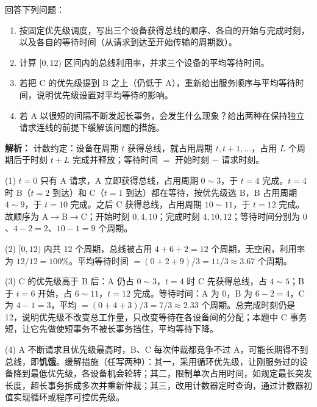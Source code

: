 \begin{enumerate}[resume]
回答下列问题：

\begin{enumerate}
\item[(1)] 按固定优先级调度，写出三个设备获得总线的顺序、各自的开始与完成时刻，以及各自的等待时间（从请求到达至开始传输的周期数）。
\item[(2)] 计算 $[0,12)$ 区间内的总线利用率，并求三个设备的平均等待时间。
\item[(3)] 若把 C 的优先级提到 B 之上（仍低于 A），重新给出服务顺序与平均等待时间，说明优先级设置对平均等待的影响。
\item[(4)] 若 A 以很短的间隔不断发起长事务，会发生什么现象？给出两种在保持独立请求连线的前提下缓解该问题的措施。
\end{enumerate}

\ifshowsolutions\par\noindent\textbf{解析：} 计数约定：设备在周期 $t$ 获得总线，就占用周期 $t,t+1,\dots$，占用 $L$ 个周期后于时刻 $t+L$ 完成并释放；等待时间 $=$ 开始时刻 $-$ 请求时刻。

(1) $t=0$ 只有 A 请求，A 立即获得总线，占用周期 $0\sim3$，于 $t=4$ 完成。$t=4$ 时 B（$t=2$ 到达）和 C（$t=1$ 到达）都在等待，按优先级选 B，B 占用周期 $4\sim9$，于 $t=10$ 完成。之后 C 获得总线，占用周期 $10\sim11$，于 $t=12$ 完成。故顺序为 A$\to$B$\to$C；开始时刻 $0,4,10$；完成时刻 $4,10,12$；等待时间分别为 $0$、$4-2=2$、$10-1=9$ 个周期。

(2) $[0,12)$ 内共 12 个周期，总线被占用 $4+6+2=12$ 个周期，无空闲，利用率为 $12/12=100\%$。平均等待时间 $=(0+2+9)/3=11/3\approx3.67$ 个周期。

(3) C 的优先级高于 B 后：A 仍占 $0\sim3$，$t=4$ 时 C 先获得总线，占 $4\sim5$；B 于 $t=6$ 开始，占 $6\sim11$，$t=12$ 完成。等待时间：A 为 0，B 为 $6-2=4$，C 为 $4-1=3$，平均 $=(0+4+3)/3=7/3\approx2.33$ 个周期。总完成时刻仍是 12，说明优先级不改变总工作量，只改变等待在各设备间的分配；本题中 C 事务短，让它先做使短事务不被长事务挡住，平均等待下降。

(4) A 不断请求且优先级最高时，B、C 每次仲裁都竞争不过 A，可能长期得不到总线，即\textbf{饥饿}。缓解措施（任写两种）：其一，采用循环优先级，让刚服务过的设备降到最低优先级，各设备机会轮转；其二，限制单次占用时间，如规定最长突发长度，超长事务拆成多次并重新仲裁；其三，改用计数器定时查询，通过计数器初值实现循环或程序可控优先级。\else \answerarea[10] \fi

\end{enumerate}
